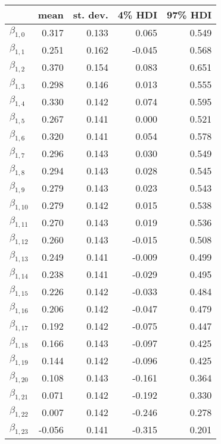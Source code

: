 \begin{tabular}{lrrrr}
\toprule
{} &   mean &  st. dev. &  4\% HDI &  97\% HDI \\
\midrule
$\beta_{1,0}$  &  0.317 &     0.133 &    0.065 &     0.549 \\
$\beta_{1,1}$  &  0.251 &     0.162 &   -0.045 &     0.568 \\
$\beta_{1,2}$  &  0.370 &     0.154 &    0.083 &     0.651 \\
$\beta_{1,3}$  &  0.298 &     0.146 &    0.013 &     0.555 \\
$\beta_{1,4}$  &  0.330 &     0.142 &    0.074 &     0.595 \\
$\beta_{1,5}$  &  0.267 &     0.141 &    0.000 &     0.521 \\
$\beta_{1,6}$  &  0.320 &     0.141 &    0.054 &     0.578 \\
$\beta_{1,7}$  &  0.296 &     0.143 &    0.030 &     0.549 \\
$\beta_{1,8}$  &  0.294 &     0.143 &    0.028 &     0.545 \\
$\beta_{1,9}$  &  0.279 &     0.143 &    0.023 &     0.543 \\
$\beta_{1,10}$ &  0.279 &     0.142 &    0.015 &     0.538 \\
$\beta_{1,11}$ &  0.270 &     0.143 &    0.019 &     0.536 \\
$\beta_{1,12}$ &  0.260 &     0.143 &   -0.015 &     0.508 \\
$\beta_{1,13}$ &  0.249 &     0.141 &   -0.009 &     0.499 \\
$\beta_{1,14}$ &  0.238 &     0.141 &   -0.029 &     0.495 \\
$\beta_{1,15}$ &  0.226 &     0.142 &   -0.033 &     0.484 \\
$\beta_{1,16}$ &  0.206 &     0.142 &   -0.047 &     0.479 \\
$\beta_{1,17}$ &  0.192 &     0.142 &   -0.075 &     0.447 \\
$\beta_{1,18}$ &  0.166 &     0.143 &   -0.097 &     0.425 \\
$\beta_{1,19}$ &  0.144 &     0.142 &   -0.096 &     0.425 \\
$\beta_{1,20}$ &  0.108 &     0.143 &   -0.161 &     0.364 \\
$\beta_{1,21}$ &  0.071 &     0.142 &   -0.192 &     0.330 \\
$\beta_{1,22}$ &  0.007 &     0.142 &   -0.246 &     0.278 \\
$\beta_{1,23}$ & -0.056 &     0.141 &   -0.315 &     0.201 \\

\end{tabular}
